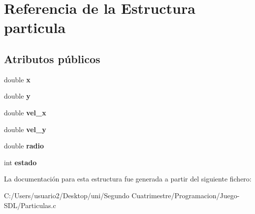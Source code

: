 \hypertarget{structparticula}{}\section{Referencia de la Estructura particula}
\label{structparticula}
\subsection*{Atributos públicos}
\begin{DoxyCompactItemize}
\item 
double {\bfseries x}\hypertarget{structparticula_a906786cb7a5dc2a7f23ea413e509787e}{}\label{structparticula_a906786cb7a5dc2a7f23ea413e509787e}

\item 
double {\bfseries y}\hypertarget{structparticula_ab766b5e07eb1fe2cf2742875686cc305}{}\label{structparticula_ab766b5e07eb1fe2cf2742875686cc305}

\item 
double {\bfseries vel\+\_\+x}\hypertarget{structparticula_aec2c5c064b22d28bc6ed15ab14005f49}{}\label{structparticula_aec2c5c064b22d28bc6ed15ab14005f49}

\item 
double {\bfseries vel\+\_\+y}\hypertarget{structparticula_a9bad6bacd7b641e8f94428934deb103f}{}\label{structparticula_a9bad6bacd7b641e8f94428934deb103f}

\item 
double {\bfseries radio}\hypertarget{structparticula_a9f6f9f5e77b0e7cd28dc62eadca31d2d}{}\label{structparticula_a9f6f9f5e77b0e7cd28dc62eadca31d2d}

\item 
int {\bfseries estado}\hypertarget{structparticula_a8aa9a431be40b532014817a7fd51b9cc}{}\label{structparticula_a8aa9a431be40b532014817a7fd51b9cc}

\end{DoxyCompactItemize}


La documentación para esta estructura fue generada a partir del siguiente fichero\+:\begin{DoxyCompactItemize}
\item 
C\+:/\+Users/usuario2/\+Desktop/uni/\+Segundo Cuatrimestre/\+Programacion/\+Juego-\/\+S\+D\+L/Particulas.\+c\end{DoxyCompactItemize}
